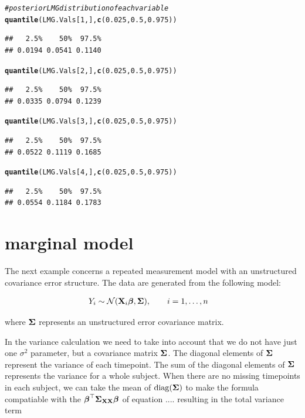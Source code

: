 \documentclass[11pt,a4paper,twoside]{book}\usepackage[]{graphicx}\usepackage[]{color}
\makeatletter
\newcommand{\hlnum}[1]{\textcolor[rgb]{0.686,0.059,0.569}{#1}}%
\newcommand{\hlcom}[1]{\textcolor[rgb]{0.678,0.584,0.686}{\textit{#1}}}%
\newcommand{\hlstd}[1]{\textcolor[rgb]{0.345,0.345,0.345}{#1}}%
\newcommand{\hlkwd}[1]{\textcolor[rgb]{0.737,0.353,0.396}{\textbf{#1}}}%
\newenvironment{kframe}{%
 \def\at@end@of@kframe{}%
 \ifinner\ifhmode%
  \def\at@end@of@kframe{\end{minipage}}%
  \begin{minipage}{\columnwidth}%
 \fi\fi%
 \def\FrameCommand##1{\hskip\@totalleftmargin \hskip-\fboxsep
 \colorbox{shadecolor}{##1}\hskip-\fboxsep
     \hskip-\linewidth \hskip-\@totalleftmargin \hskip\columnwidth}%
 \MakeFramed {\advance\hsize-\width
   \@totalleftmargin\z@ \linewidth\hsize
   \@setminipage}}%
 {\par\unskip\endMakeFramed%
 \at@end@of@kframe}
\newenvironment{knitrout}{}{} %
\makeatother
\begin{document}
\begin{knitrout}
\begin{kframe}
\begin{alltt}
\hlcom{# posterior LMG distribution of each variable}
\hlkwd{quantile}\hlstd{(LMG.Vals[}\hlnum{1}\hlstd{,],} \hlkwd{c}\hlstd{(}\hlnum{0.025}\hlstd{,} \hlnum{0.5}\hlstd{,} \hlnum{0.975}\hlstd{))}
\end{alltt}
\begin{verbatim}
##   2.5%    50%  97.5% 
## 0.0194 0.0541 0.1140
\end{verbatim}
\begin{alltt}
\hlkwd{quantile}\hlstd{(LMG.Vals[}\hlnum{2}\hlstd{,],} \hlkwd{c}\hlstd{(}\hlnum{0.025}\hlstd{,} \hlnum{0.5}\hlstd{,} \hlnum{0.975}\hlstd{))}
\end{alltt}
\begin{verbatim}
##   2.5%    50%  97.5% 
## 0.0335 0.0794 0.1239
\end{verbatim}
\begin{alltt}
\hlkwd{quantile}\hlstd{(LMG.Vals[}\hlnum{3}\hlstd{,],} \hlkwd{c}\hlstd{(}\hlnum{0.025}\hlstd{,} \hlnum{0.5}\hlstd{,} \hlnum{0.975}\hlstd{))}
\end{alltt}
\begin{verbatim}
##   2.5%    50%  97.5% 
## 0.0522 0.1119 0.1685
\end{verbatim}
\begin{alltt}
\hlkwd{quantile}\hlstd{(LMG.Vals[}\hlnum{4}\hlstd{,],} \hlkwd{c}\hlstd{(}\hlnum{0.025}\hlstd{,} \hlnum{0.5}\hlstd{,} \hlnum{0.975}\hlstd{))}
\end{alltt}
\begin{verbatim}
##   2.5%    50%  97.5% 
## 0.0554 0.1184 0.1783
\end{verbatim}
\end{kframe}
\end{knitrout}

\section{marginal  model}

The next example concerns a repeated measurement model with an unstructured covariance error structure. The data are generated from the following model:

\begin{align} 
&Y_{i} \sim \mathcal{N}({\mathbf{X}}_{i} {\boldsymbol{\beta}}, {\boldsymbol{\Sigma}}{}), \qquad i = 1, \dots, n
\end{align} 

where ${\boldsymbol{\Sigma}}{}$ represents an unstructured error covariance matrix.

In the variance calculation we need to take into account that we do not have just one $\sigma^2$ parameter, but a covariance matrix ${\boldsymbol{\Sigma}}{}$. The diagonal elements of ${\boldsymbol{\Sigma}}{}$ represent the variance of each timepoint. The sum of the diagonal elements of ${\boldsymbol{\Sigma}}{}$ represents the variance for a whole subject. When there are no missing timepoints in each subject, we can  take the mean of $\operatorname{diag}({\boldsymbol{\Sigma}}{})$ to make the formula compatiable with the ${\boldsymbol{\beta}}^\top {\boldsymbol{\Sigma}}{}_{{\mathbf{X}} {\mathbf{X}}}  {\boldsymbol{\beta}}$ of equation .... resulting in the total variance term
\end{document}
